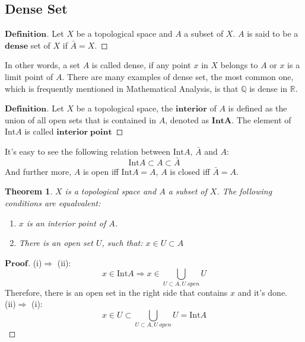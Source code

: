 \documentclass[a4paper, 11pt]{article}
\newtheorem{theorem}{Theorem}
\theoremstyle{remark}
\newenvironment{myprf}
{\renewcommand\qedsymbol{$ $}\begin{proof}[$\mathbf{Proof}$]}
  {\end{proof}}
\newenvironment{mydef}
{\renewcommand\qedsymbol{$ $}\begin{proof}[$\mathbf{Definition}$]}
  {\end{proof}}
\theoremstyle{definition}
\begin{document}
\subsection{Dense Set}
\begin{mydef}
    Let $X$ be a topological space and $A$ a subset of $X$. $A$ is said to be 
    a $\bm{dense}$ set of $X$ if $\bar{A}=X$. 
\end{mydef}
In other words, a set $A$ is called dense, if any point $x$ in $X$ belongs to $A$ or $x$ is a limit point of $A$. There are many examples of dense set, the most
common one,  which is frequently mentioned in Mathematical Analysis, is that
$\mathbb{Q}$ is dense in $\mathbb{R}$. 
\begin{mydef}
        Let $X$ be a topological space, the $\bm{interior}$ of $A$ is defined as
        the union of all open sets that is contained in $A$, denoted as 
        $\mathbf{IntA}$. The element of $\mathrm{Int}A$ is called 
        $\bm{interior\; point}$
\end{mydef}
\noindent
It's easy to see the following relation between $\mathrm{Int}A$, $\bar{A}$ and
$A$:
$$
\mathrm{Int}A\subset A\subset \bar{A}
$$ 
\noindent
And further more, $A$ is open iff $\mathrm{Int}A=A$, $A$ is closed iff 
$\bar{A}=A$.
\begin{theorem}
        $X$ is a topological space and $A$ a subset of $X$.
        The following conditions are equalvalent:
        \begin{enumerate}[label=(\roman*)]
                \item   $x$ is an interior point of $A$.
                \item   There is an open set $U$, such that: $x\in U\subset A$
        \end{enumerate}
\end{theorem}
\begin{myprf}
        (i)$\Rightarrow$ (ii): \\
        $$x\in \mathrm{Int}A\Rightarrow x\in \displaystyle
        \bigcup_{U\subset A,U\;open}U$$
        Therefore, there is an open set in the right side that contains
        $x$ and it's done.\\
        (ii)$\Rightarrow$ (i):\\
        $$x\in U\subset \bigcup_{U\subset A,U\;open}U=\mathrm{Int}A$$
\end{myprf}
\end{document}
